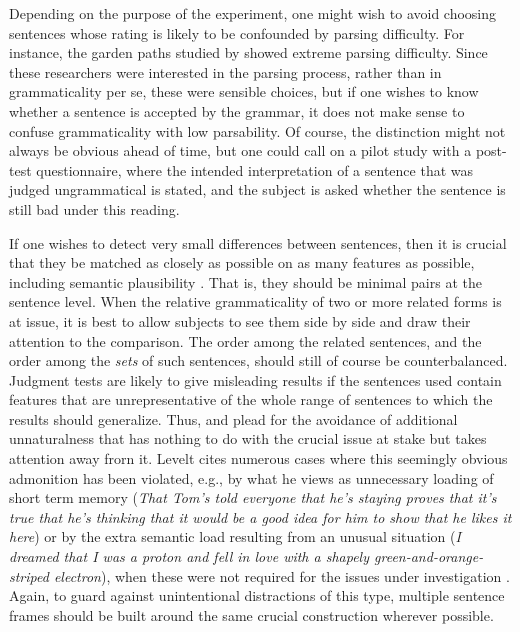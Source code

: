  Depending on the purpose of the experiment, one might wish to avoid choosing sentences whose rating is likely to be confounded by parsing difficulty. For instance, the garden paths studied by \citet{WarnerEtAl1987} showed extreme parsing difficulty. Since these researchers were interested in the parsing process, rather than in grammaticality per se, these were sensible choices, but if one wishes to know whether a sentence is accepted by the grammar, it does not make sense to confuse grammaticality with low parsability. Of course, the distinction might not always be obvious ahead of time, but one could call on a pilot
 study with a post-test questionnaire, where the intended interpretation of a sentence that was judged ungrammatical is stated, and the subject is asked whether the sentence is still bad under this reading.

 If one wishes to detect very small differences between sentences, then it is crucial that they be matched as closely as possible on as many features as possible, including semantic plausibility \citep{CardenEtAl1981}. That is, they should be minimal pairs at the sentence level. When the relative grammaticality of two or more related forms is at issue, it is best to allow subjects to see them side by side and draw their attention to the comparison. The order among the related sentences, and the order among the \textit{sets} of such sentences, should still of course be counterbalanced. Judgment tests are likely to give misleading results if the sentences used contain features that are unrepresentative of the whole range of sentences to which the results should generalize. Thus, \citet[vol. 3]{Levelt1974} and \citet{Bolinger1971} plead for the avoidance of additional unnaturalness that has nothing to do with the crucial issue at stake but takes attention away frorn it. Levelt cites numerous cases where this seemingly obvious admonition has been violated, e.g., by what he views as unnecessary loading of short term memory (\textit{That Tom's told everyone that he's staying proves that it's true that he's thinking that it would be a good idea for him to show that he likes it here}) or by the extra semantic load resulting from an unusual situation (\textit{I dreamed that I was a proton and fell in love with a shapely green-and-orange-striped electron}), when these were not required for the issues under investigation \citep{Levelt1972}. Again, to guard against unintentional distractions of this type, multiple sentence frames should be built around the same crucial construction wherever possible.

